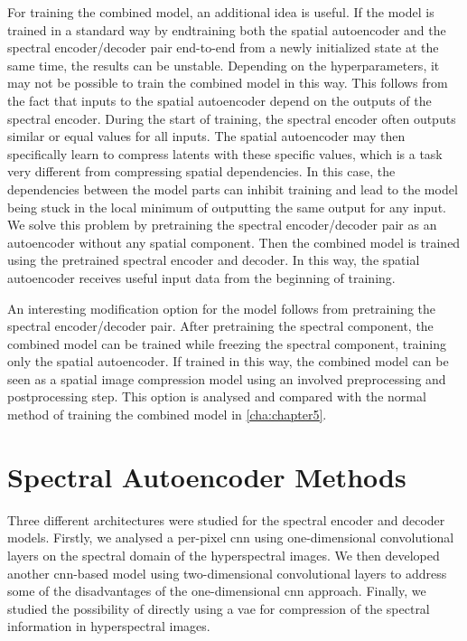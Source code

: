 For training the combined model, an additional idea is useful. If the model is trained in a standard way by endtraining both the spatial autoencoder and the spectral encoder/decoder pair end-to-end from a newly initialized state at the same time, the results can be unstable. Depending on the hyperparameters, it may not be possible to train the combined model in this way. This follows from the fact that inputs to the spatial autoencoder depend on the outputs of the spectral encoder. During the start of training, the spectral encoder often outputs similar or equal values for all inputs. The spatial autoencoder may then specifically learn to compress latents with these specific values, which is a task very different from compressing spatial dependencies. In this case, the dependencies between the model parts can inhibit training and lead to the model being stuck in the local minimum of outputting the same output for any input. We solve this problem by pretraining the spectral encoder/decoder pair as an autoencoder without any spatial component. Then the combined model is trained using the pretrained spectral encoder and decoder. In this way, the spatial autoencoder receives useful input data from the beginning of training. 

An interesting modification option for the model follows from pretraining the spectral encoder/decoder pair. After pretraining the spectral component, the combined model can be trained while freezing the spectral component, training only the spatial autoencoder. If trained in this way, the combined model can be seen as a spatial image compression model using an involved preprocessing and postprocessing step. This option is analysed and compared with the normal method of training the combined model in \autoref{cha:chapter5}.
\section{Spectral Autoencoder Methods}
Three different architectures were studied for the spectral encoder and decoder models. Firstly, we analysed a per-pixel \ac{cnn} using one-dimensional convolutional layers on the spectral domain of the hyperspectral images. We then developed another \ac{cnn}-based model using two-dimensional convolutional layers to address some of the disadvantages of the one-dimensional \ac{cnn} approach. Finally, we studied the possibility of directly using a \ac{vae} for compression of the spectral information in hyperspectral images. 
